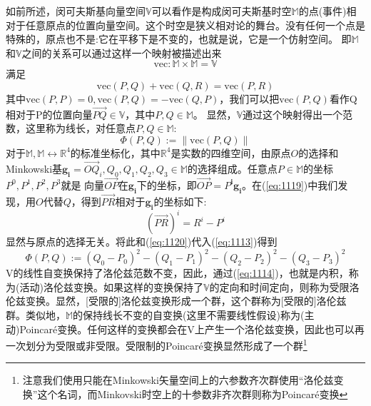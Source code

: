 \documentclass[utf8]{ctexbook}
\numberwithin{equation}{section}
\begin{document}
如前所述，闵可夫斯基向量空间$\mathbb{V}$可以看作是构成闵可夫斯基时空$\mathbb{M}$的点(事件)相对于任意原点的位置向量空间。这个时空是狭义相对论的舞台。没有任何一个点是特殊的，原点也不是:它在平移下是不变的，也就是说，它是一个仿射空间。
即$\mathbb{M}$和$\mathbb{V}$之间的关系可以通过这样一个映射被描述出来
\begin{equation}
    \mathrm{vec}:\mathbb{M}\times \mathbb{M}=\mathbb{V}
\end{equation}
满足
\begin{equation}
    \mathrm{vec}(P,Q) +\mathrm{vec}(Q,R) = \mathrm{vec}(P,R)\label{eq:1119}
\end{equation}
其中$\mathrm{vec} (P,P)=0, \mathrm{vec}(P,Q)=-\mathrm{vec}(Q, P)$，我们可以把$\mathrm{vec}(P, Q)$看作Q相对于P的位置向量$\overrightarrow{PQ}\in \mathbb{V} $，其中$P, Q\in \mathbb{M}$。
显然，$\mathbb{V}$通过这个映射得出一个范数，这里称为线长，对任意点$P,Q \in \mathbb{M}$:
\begin{equation}
    \Phi (P,Q):= \left\lVert \mathrm{vec} (P,Q)\right\rVert \label{eq:1120}
\end{equation}
对于$\mathbb{M},\mathbb{M}\leftrightarrow \mathbb{R}^4$的标准坐标化，其中$\mathbb{R}^4$是实数的四维空间，由原点$O$的选择和Minkowski基$\mathbf{g_i}=\overrightarrow{OQ}_i,Q_0,Q_1,Q_2,Q_3\in \mathbb{M}$的选择组成。任意点$P\in\mathbb{M}$的坐标$P^0, P^1 ,P^2 ,P^3$就是
向量$\overrightarrow{OP}$在$\mathbf{g_i}$下的坐标，即$\overrightarrow{OP} = P^\mathbf{i}\mathbf{g_i}$。在(\ref{eq:1119})中我们发现，用$O$代替$Q$，得到$\overrightarrow{PR}$相对于$\mathbf{g_i}$的坐标如下:
\begin{equation}
    (\overrightarrow{PR})^i = R^i-P^i\label{eq:1121}
\end{equation}
显然与原点的选择无关。将此和(\ref{eq:1120})代入(\ref{eq:1113})得到
\begin{equation}
    \Phi (P,Q):=(Q_0-P_0)^2 - (Q_1-P_1)^2  - (Q_2-P_2)^2 - (Q_3-P_3)^2 
\end{equation} 
V的线性自变换保持了洛伦兹范数不变，因此，通过(\ref{eq:1114})，也就是内积，称为(活动)洛伦兹变换。如果这样的变换保持了$\mathbb{V}$的定向和时间定向，则称为受限洛伦兹变换。显然，[受限的]洛伦兹变换形成一个群，这个群称为[受限的]洛伦兹群。类似地，$\mathbb{M}$的保持线长不变的自变换(这里不需要线性假设)称为(主动)Poincaré变换。任何这样的变换都会在V上产生一个洛伦兹变换，因此也可以再一次划分为受限或非受限。受限制的Poincaré变换显然形成了一个群\footnote{注意我们使用只能在Minkowski矢量空间上的六参数齐次群使用“洛伦兹变换”这个名词，而Minkovski时空上的十参数非齐次群则称为Poincaré变换}
\end{document}
